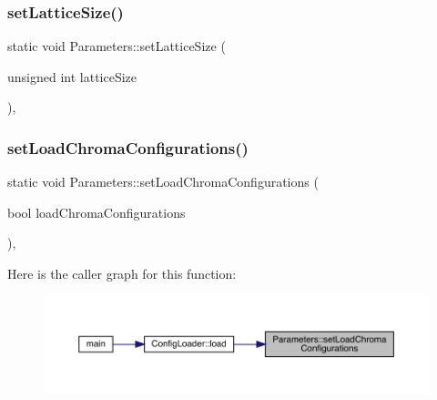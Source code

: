 \subsubsection{\texorpdfstring{setLatticeSize()}{setLatticeSize()}}
{\footnotesize\ttfamily static void Parameters\+::set\+Lattice\+Size (\begin{DoxyParamCaption}\item[{unsigned int}]{lattice\+Size }\end{DoxyParamCaption})\hspace{0.3cm}{\ttfamily [inline]}, {\ttfamily [static]}}

\mbox{\label{class_parameters_a632a2371d7b5d157df2dd42e7b6ab843}} 
\subsubsection{\texorpdfstring{setLoadChromaConfigurations()}{setLoadChromaConfigurations()}}
{\footnotesize\ttfamily static void Parameters\+::set\+Load\+Chroma\+Configurations (\begin{DoxyParamCaption}\item[{bool}]{load\+Chroma\+Configurations }\end{DoxyParamCaption})\hspace{0.3cm}{\ttfamily [inline]}, {\ttfamily [static]}}

Here is the caller graph for this function\+:
\nopagebreak
\begin{figure}[H]
\begin{center}
\leavevmode
\includegraphics[width=350pt]{class_parameters_a632a2371d7b5d157df2dd42e7b6ab843_icgraph}
\end{center}
\end{figure}
\mbox{\label{class_parameters_aa7e911174ec1991f6750b9774b184fd3}} 
